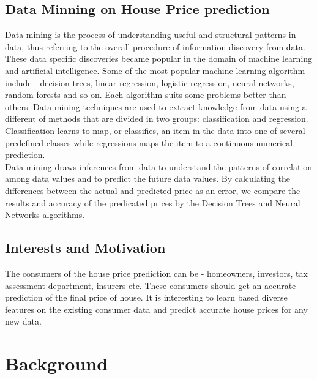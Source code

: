 \documentclass[fleqn,10pt]{SelfArx} %
\begin{document}
	
	\subsection{Data Minning on House Price prediction}
	Data mining is the process of understanding useful and structural patterns in data, thus referring to the overall procedure of information discovery from data. These data specific discoveries became popular in the domain of machine learning and artificial intelligence. Some of the most popular machine learning algorithm include - decision trees, linear regression, logistic regression, neural networks, random forests and so on. Each algorithm suits some problems better than others. Data mining techniques are used to extract knowledge from data using a different of methods that are divided in two groups: classification and regression. Classification learns to map, or classifies, an item in the data into one of several predefined classes while regressions maps the item to a continuous numerical prediction.\\
	
	Data mining draws inferences from data to understand the patterns of correlation among data values and to predict the future data values. By calculating the differences between the actual and predicted price as an error, we compare the results and accuracy of the predicated prices by the Decision Trees and Neural Networks algorithms. 
	
	\subsection{Interests and Motivation}
	The consumers of the house price prediction can be - homeowners, investors, tax assessment department, insurers etc. These consumers should get an accurate prediction of the final price of house. It is interesting to learn based diverse features on the existing consumer data and predict accurate house prices for any new data.  

	
	
	\section{Background}
	
\end{document}
